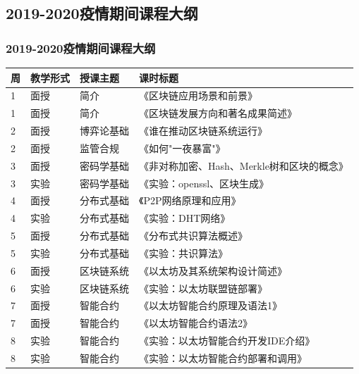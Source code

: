 \documentclass[11pt]{beamer}
\begin{document}
\subsection{2019-2020疫情期间课程大纲}
\begin{frame}[allowframebreaks]
	\frametitle{2019-2020疫情期间课程大纲}

	\begin{longtable}{llll}
		\hline
		周 & 教学形式 & 授课主题   & 课时标题                                           \\ \hline
		\endfirsthead
		\endhead
		\hline
		\endfoot
		\endlastfoot
		1  & 面授     & 简介       & 《区块链应用场景和前景》                           \\
		1  & 面授     & 简介       & 《区块链发展方向和著名成果简述》                   \\
		2  & 面授     & 博弈论基础 & 《谁在推动区块链系统运行》                         \\
		2  & 面授     & 监管合规   & 《如何"一夜暴富"》                                 \\
		3  & 面授     & 密码学基础 & \small{《非对称加密、Hash、Merkle树和区块的概念》} \\
		3  & 实验     & 密码学基础 & 《实验：openssl、区块生成》                        \\
		4  & 面授     & 分布式基础 & 《P2P网络原理和应用》                              \\
		4  & 实验     & 分布式基础 & 《实验：DHT网络》                                  \\
		5  & 面授     & 分布式基础 & 《分布式共识算法概述》                             \\
		5  & 实验     & 分布式基础 & 《实验：共识算法》                                 \\
		6  & 面授     & 区块链系统 & 《以太坊及其系统架构设计简述》                     \\
		6  & 实验     & 区块链系统 & 《实验：以太坊联盟链部署》                         \\
		7  & 面授     & 智能合约   & 《以太坊智能合约原理及语法1》                      \\
		7  & 面授     & 智能合约   & 《以太坊智能合约语法2》                            \\
		8  & 实验     & 智能合约   & 《实验：以太坊智能合约开发IDE介绍》                \\
		8  & 实验     & 智能合约   & 《实验：以太坊智能合约部署和调用》                 \\

\end{longtable}
\end{frame}
\end{document}
